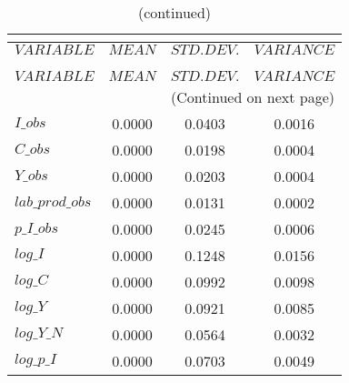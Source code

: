  
\begin{center}
\begin{longtable}{lccc} 
\caption{THEORETICAL MOMENTS}\\
 \label{Table:th_moments}\\
\toprule 
$VARIABLE        $	 & 	 $         MEAN$	 & 	 $    STD. DEV.$	 & 	 $     VARIANCE$\\
\midrule \endfirsthead 
\caption{(continued)}\\
 \toprule \\ 
$VARIABLE        $	 & 	 $         MEAN$	 & 	 $    STD. DEV.$	 & 	 $     VARIANCE$\\
\midrule \endhead 
\midrule \multicolumn{4}{r}{(Continued on next page)} \\ \bottomrule \endfoot 
\bottomrule \endlastfoot 
$I\_obs          $	 & 	       0.0000	 & 	       0.0403	 & 	       0.0016 \\ 
$C\_obs          $	 & 	       0.0000	 & 	       0.0198	 & 	       0.0004 \\ 
$Y\_obs          $	 & 	       0.0000	 & 	       0.0203	 & 	       0.0004 \\ 
$lab\_prod\_obs  $	 & 	       0.0000	 & 	       0.0131	 & 	       0.0002 \\ 
$p\_I\_obs       $	 & 	       0.0000	 & 	       0.0245	 & 	       0.0006 \\ 
$log\_I          $	 & 	       0.0000	 & 	       0.1248	 & 	       0.0156 \\ 
$log\_C          $	 & 	       0.0000	 & 	       0.0992	 & 	       0.0098 \\ 
$log\_Y          $	 & 	       0.0000	 & 	       0.0921	 & 	       0.0085 \\ 
$log\_Y\_N       $	 & 	       0.0000	 & 	       0.0564	 & 	       0.0032 \\ 
$log\_p\_I       $	 & 	       0.0000	 & 	       0.0703	 & 	       0.0049 \\ 
\end{longtable}
 \end{center}
